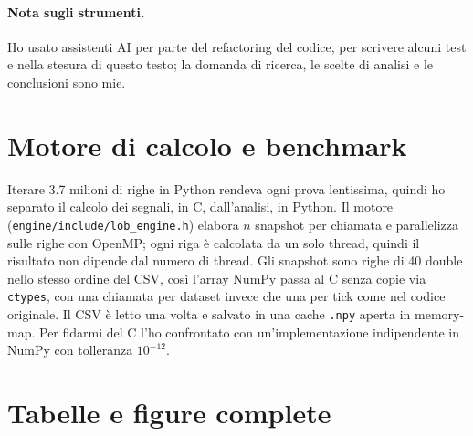 \documentclass[a4paper,11pt]{article}
\newcommand{\code}[1]{\texttt{#1}}
\begin{document}
\paragraph{Nota sugli strumenti.} Ho usato assistenti AI per parte del refactoring del codice,
per scrivere alcuni test e nella stesura di questo testo; la domanda di ricerca, le scelte di
analisi e le conclusioni sono mie.

\appendix

\section{Motore di calcolo e benchmark}
\label{app:calcolo}

Iterare 3.7 milioni di righe in Python rendeva ogni prova lentissima, quindi ho separato il
calcolo dei segnali, in C, dall'analisi, in Python. Il motore (\code{engine/include/lob\_engine.h})
elabora $n$ snapshot per chiamata e parallelizza sulle righe con OpenMP; ogni riga è calcolata
da un solo thread, quindi il risultato non dipende dal numero di thread. Gli snapshot sono righe
di 40 double nello stesso ordine del CSV, così l'array NumPy passa al C senza copie via
\code{ctypes}, con una chiamata per dataset invece che una per tick come nel codice originale.
Il CSV è letto una volta e salvato in una cache \code{.npy} aperta in memory-map. Per fidarmi
del C l'ho confrontato con un'implementazione indipendente in NumPy con tolleranza $10^{-12}$.



\section{Tabelle e figure complete}
\label{app:tabelle}

\end{document}
